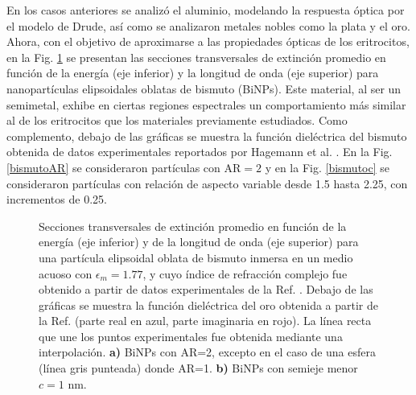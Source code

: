 En los casos anteriores se analizó el aluminio, modelando la respuesta óptica por el modelo de Drude, así como se analizaron metales nobles como la plata y el oro. Ahora, con el objetivo de aproximarse a las propiedades ópticas de los eritrocitos, en la Fig. \ref{bismuto} se presentan las secciones transversales de extinción promedio en función de la energía (eje inferior) y la longitud de onda (eje superior) para nanopartículas elipsoidales oblatas de bismuto (BiNPs). Este material, al ser un semimetal, exhibe en ciertas regiones espectrales un comportamiento más similar al de los eritrocitos que los materiales previamente estudiados. Como complemento, debajo de las gráficas se muestra la función dieléctrica del bismuto obtenida de datos experimentales reportados por Hagemann et al. \cite{Bismuto}. En la Fig. \ref{bismutoAR} se consideraron partículas con  AR$=2$  y en la Fig. \ref{bismutoc} se consideraron partículas con relación de aspecto variable desde 1.5 hasta 2.25, con incrementos de 0.25.  \\

\begin{figure}[]
	\quad%
	\caption{Secciones transversales de extinción promedio  en función de la energía (eje inferior) y de la longitud de onda (eje superior) para una partícula elipsoidal oblata de bismuto inmersa en un medio acuoso con $\epsilon_m=1.77$, y cuyo índice de refracción complejo fue obtenido a partir de datos experimentales de la Ref. \cite{Bismuto}. Debajo de las gráficas se muestra la función dieléctrica del oro obtenida a partir de la Ref. \cite{Plata} (parte real en azul, parte imaginaria en rojo). La línea recta que une los puntos experimentales fue obtenida mediante una interpolación. \textbf{a)} BiNPs con AR=2, excepto en el caso de una esfera (línea gris punteada) donde AR=1. \textbf{b)} BiNPs con semieje menor $c=1$ nm.}\label{bismuto}
\end{figure}

